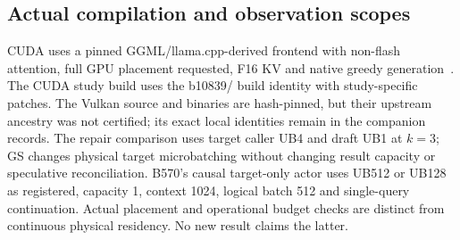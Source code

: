 \subsection{Actual compilation and observation scopes}
CUDA uses a pinned GGML/llama.cpp-derived frontend with non-flash attention, full GPU placement requested, F16 KV and native greedy generation~\cite{llamacpp}. The CUDA study build uses the b10839/ build identity with study-specific patches. The Vulkan source and binaries are hash-pinned, but their upstream ancestry was not certified; its exact local identities remain in the companion records. The repair comparison uses target caller UB4 and draft UB1 at $k=3$; GS changes physical target microbatching without changing result capacity or speculative reconciliation. B570's causal target-only actor uses UB512 or UB128 as registered, capacity 1, context 1024, logical batch 512 and single-query continuation. Actual placement and operational budget checks are distinct from continuous physical residency. No new result claims the latter.

